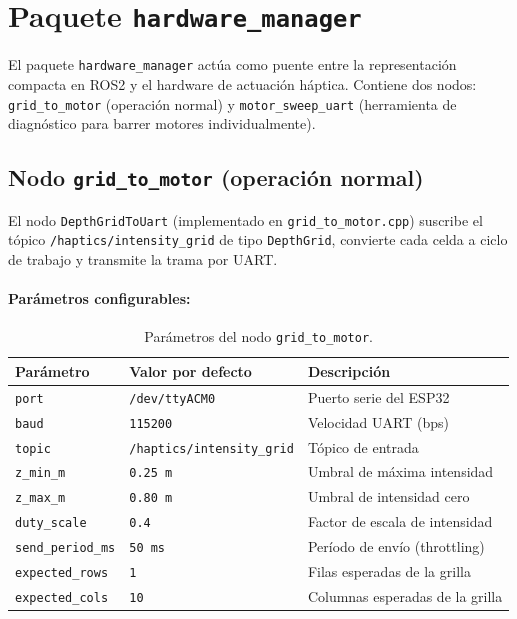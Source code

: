 \section{Paquete \texttt{hardware\_manager}}
\label{sec:impl-hardware-manager}

El paquete \texttt{hardware\_manager} actúa como puente entre la representación compacta en ROS2 y el hardware de actuación háptica. Contiene dos nodos: \texttt{grid\_to\_motor} (operación normal) y \texttt{motor\_sweep\_uart} (herramienta de diagnóstico para barrer motores individualmente).

\subsection{Nodo \texttt{grid\_to\_motor} (operación normal)}

El nodo \texttt{DepthGridToUart} (implementado en \texttt{grid\_to\_motor.cpp}) suscribe el tópico \texttt{/haptics/intensity\_grid} de tipo \texttt{DepthGrid}, convierte cada celda a ciclo de trabajo y transmite la trama por UART.

\paragraph{Parámetros configurables:}

\begin{table}[h]
\centering
\begin{tabular}{lll}
\hline
\textbf{Parámetro}      & \textbf{Valor por defecto}     & \textbf{Descripción} \\
\hline
\texttt{port}           & \texttt{/dev/ttyACM0}          & Puerto serie del ESP32          \\
\texttt{baud}           & \texttt{115200}                & Velocidad UART (bps)            \\
\texttt{topic}          & \texttt{/haptics/intensity\_grid} & Tópico de entrada            \\
\texttt{z\_min\_m}      & \texttt{0.25\,m}               & Umbral de máxima intensidad     \\
\texttt{z\_max\_m}      & \texttt{0.80\,m}               & Umbral de intensidad cero       \\
\texttt{duty\_scale}    & \texttt{0.4}                   & Factor de escala de intensidad  \\
\texttt{send\_period\_ms} & \texttt{50\,ms}              & Período de envío (throttling)   \\
\texttt{expected\_rows} & \texttt{1}                     & Filas esperadas de la grilla    \\
\texttt{expected\_cols} & \texttt{10}                    & Columnas esperadas de la grilla \\
\hline
\end{tabular}
\caption{Parámetros del nodo \texttt{grid\_to\_motor}.}
\label{tab:grid-to-motor-params}
\end{table}

